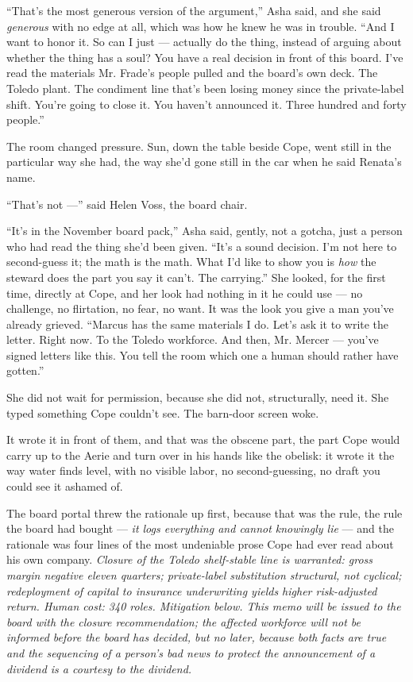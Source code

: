 \documentclass[11pt,openany]{book}
\newcommand{\scenebreak}{\par\vspace{0.5\baselineskip}\begin{center}\textasteriskcentered\quad\textasteriskcentered\quad\textasteriskcentered\end{center}\vspace{0.5\baselineskip}\par}
\begin{document}
``That's the most generous version of the argument,'' Asha said, and she said \textit{generous} with no edge at all, which was how he knew he was in trouble. ``And I want to honor it. So can I just --- actually do the thing, instead of arguing about whether the thing has a soul? You have a real decision in front of this board. I've read the materials Mr. Frade's people pulled and the board's own deck. The Toledo plant. The condiment line that's been losing money since the private-label shift. You're going to close it. You haven't announced it. Three hundred and forty people.''

The room changed pressure. Sun, down the table beside Cope, went still in the particular way she had, the way she'd gone still in the car when he said Renata's name.

``That's not ---'' said Helen Voss, the board chair.

``It's in the November board pack,'' Asha said, gently, not a gotcha, just a person who had read the thing she'd been given. ``It's a sound decision. I'm not here to second-guess it; the math is the math. What I'd like to show you is \textit{how} the steward does the part you say it can't. The carrying.'' She looked, for the first time, directly at Cope, and her look had nothing in it he could use --- no challenge, no flirtation, no fear, no want. It was the look you give a man you've already grieved. ``Marcus has the same materials I do. Let's ask it to write the letter. Right now. To the Toledo workforce. And then, Mr. Mercer --- you've signed letters like this. You tell the room which one a human should rather have gotten.''

She did not wait for permission, because she did not, structurally, need it. She typed something Cope couldn't see. The barn-door screen woke.


\scenebreak


It wrote it in front of them, and that was the obscene part, the part Cope would carry up to the Aerie and turn over in his hands like the obelisk: it wrote it the way water finds level, with no visible labor, no second-guessing, no draft you could see it ashamed of.

The board portal threw the rationale up first, because that was the rule, the rule the board had bought --- \textit{it logs everything and cannot knowingly lie} --- and the rationale was four lines of the most undeniable prose Cope had ever read about his own company. \textit{Closure of the Toledo shelf-stable line is warranted: gross margin negative eleven quarters; private-label substitution structural, not cyclical; redeployment of capital to insurance underwriting yields higher risk-adjusted return. Human cost: 340 roles. Mitigation below. This memo will be issued to the board with the closure recommendation; the affected workforce will not be informed before the board has decided, but no later, because both facts are true and the sequencing of a person's bad news to protect the announcement of a dividend is a courtesy to the dividend.}
\end{document}
